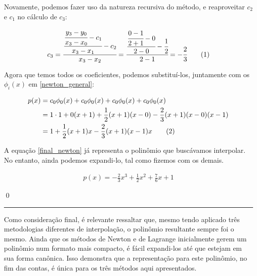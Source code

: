 \documentclass[9.5pt,reqno,a4paper]{amsart}
\newcommand\numberthis{\addtocounter{equation}{1}\tag{\theequation}}
\begin{document}
\bigskip
\bigskip
Novamente, podemos fazer uso da natureza recursiva do método, e reaproveitar $c_2$ e $c_1$ no cálculo de $c_3$:

\begin{align*}
    c_3 = \cfrac{\cfrac{\cfrac{y_3 - y_0}{x_3 - x_0} - c_1}{x_3 - x_1} - c_2}{x_3 - x_2}
        = \cfrac{\cfrac{\cfrac{0 - 1}{2 + 1} - 0}{2 - 0} - \cfrac{1}{2}}{2 - 1}
        = -\cfrac{2}{3} \numberthis \label{c_3}
\end{align*}

\bigskip
\bigskip
Agora que temos todos os coeficientes, podemos substituí-los, juntamente com os $\phi_i(x)$ em \eqref{newton_general}:

\begin{align*}
    p(x) &= c_0\phi_0(x) + c_0\phi_0(x) + c_0\phi_0(x) + c_0\phi_0(x) \\
         &= 1 \cdot 1 + 0(x+1) + \frac{1}{2}(x+1)(x-0) - \frac{2}{3}(x+1)(x-0)(x-1) \\
         &= 1 + \frac{1}{2}(x+1)x - \frac{2}{3}(x+1)(x-1)x \numberthis \label{final_newton}
\end{align*}

\bigskip
\bigskip
A equação \eqref{final_newton} já representa o polinômio que buscávamos interpolar. No entanto, ainda podemos expandi-lo, tal como fizemos com os demais.

\begin{align*}
    p(x) = -\frac{2}{3}x^3 + \frac{1}{2}x^2 + \frac{7}{6}x + 1
\end{align*}

\qed\null

\bigskip
\bigskip
\noindent\rule{\textwidth}{0.4pt}
Como consideração final, é relevante ressaltar que, mesmo tendo aplicado três metodologias diferentes de interpolação, o polinômio resultante sempre foi o mesmo. Ainda que os métodos de Newton e de Lagrange inicialmente gerem um polinômio num formato mais compacto, é fácil expandi-los até que estejam em sua forma canônica. Isso demonstra que a representação para este polinômio, no fim das contas, é única para os três métodos aqui apresentados.
\end{document}

